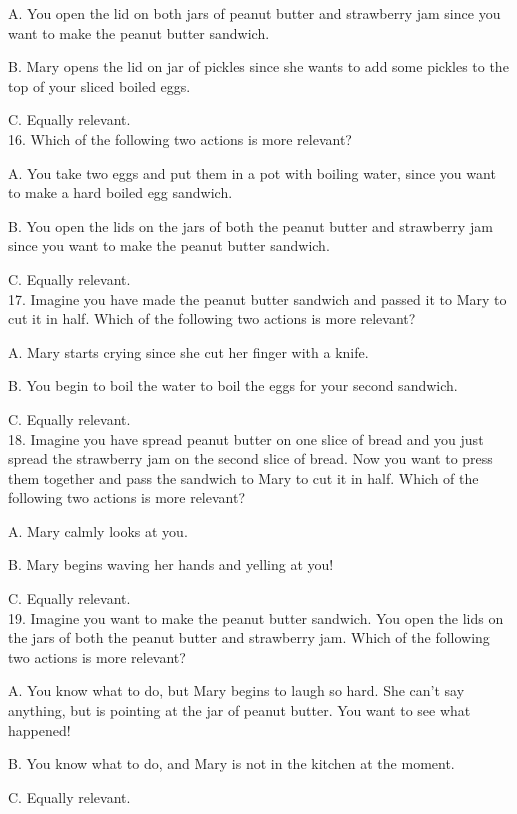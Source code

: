 \documentclass[12pt]{report}
\begin{document}
\begin{appendices}
A. You open the lid on both jars of peanut butter and strawberry jam since you want to make the peanut butter sandwich. 

B. Mary opens the lid on jar of pickles since she wants to add some pickles to the top of your sliced boiled eggs.

C. Equally relevant.\\


16. Which of the following two actions is more relevant?

A. You take two eggs and put them in a pot with boiling water, since you want to make a hard boiled egg sandwich.

B. You open the lids on the jars of both the peanut butter and strawberry jam since you want to make the peanut butter sandwich. 

C. Equally relevant.\\


17. Imagine you have made the peanut butter sandwich and passed it to Mary to cut it in half. Which of the following two actions is more relevant?

A. Mary starts crying since she cut her finger with a knife.

B. You begin to boil the water to boil the eggs for your second sandwich.

C. Equally relevant.\\


18. Imagine you have spread peanut butter on one slice of bread and you just spread the strawberry jam on the second slice of bread. Now you want to press them together and pass the sandwich to Mary to cut it in half. Which of the following two actions is more relevant? 

A. Mary calmly looks at you.

B. Mary begins waving her hands and yelling at you!

C. Equally relevant.\\


19. Imagine you want to make the peanut butter sandwich. You open the lids on the jars of both the peanut butter and strawberry jam. Which of the following two actions is more relevant? 

A. You know what to do, but Mary begins to laugh so hard. She can't say anything, but is pointing at the jar of peanut butter. You want to see what happened!

B. You know what to do, and Mary is not in the kitchen at the moment.

C. Equally relevant.\\


\end{appendices}
\end{document}
